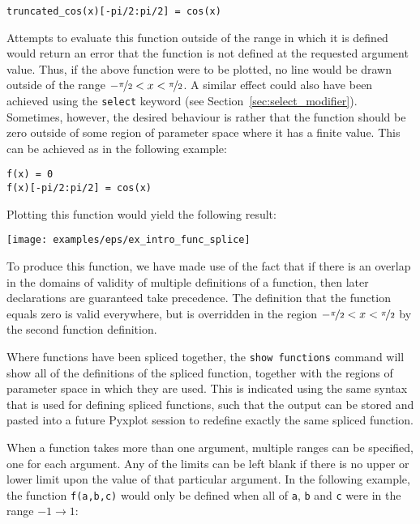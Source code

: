 \begin{verbatim}
truncated_cos(x)[-pi/2:pi/2] = cos(x)
\end{verbatim}

\noindent Attempts to evaluate this function outside of the range in which it
is defined would return an error that the function is not defined at the
requested argument value. Thus, if the above function were to be plotted, no
line would be drawn outside of the range
$-\nicefrac{\pi}{2}<x<\nicefrac{\pi}{2}$. A similar effect could also have been
achieved using the {\tt select} keyword (see
Section~\ref{sec:select_modifier}). Sometimes, however, the desired behaviour
is rather that the function should be zero outside of some region of parameter
space where it has a finite value. This can be achieved as in the following
example:

\begin{verbatim}
f(x) = 0
f(x)[-pi/2:pi/2] = cos(x)
\end{verbatim}

\noindent Plotting this function would yield the following result:

\begin{center}
\texttt{[image: examples/eps/ex\_intro\_func\_splice]}
\end{center}

\noindent To produce this function, we have made use of the fact that if there
is an overlap in the domains of validity of multiple definitions of a function,
then later declarations are guaranteed take precedence. The definition that the
function equals zero is valid everywhere, but is overridden in the region
$-\nicefrac{\pi}{2}<x<\nicefrac{\pi}{2}$ by the second function definition.

Where functions have been spliced together, the {\tt show functions} command
will show all of the definitions of the spliced function, together with the
regions of parameter space in which they are used. This is indicated using the
same syntax that is used for defining spliced functions, such that the output can
be stored and pasted into a future Pyxplot session to redefine exactly the same
spliced function.

When a function takes more than one argument, multiple ranges can be specified,
one for each argument. Any of the limits can be left blank if there is no
upper or lower limit upon the value of that particular argument. In the
following example, the function {\tt f(a,b,c)} would only be defined when all
of {\tt a}, {\tt b} and {\tt c} were in the range $-1 \to 1$:

